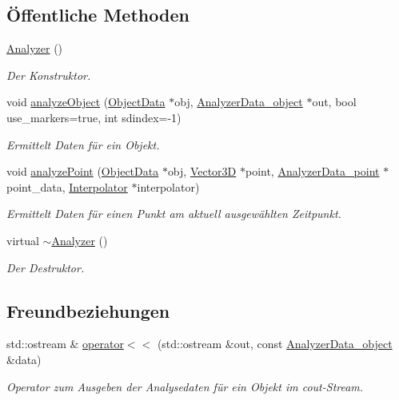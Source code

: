 \subsection*{Öffentliche Methoden}
\begin{DoxyCompactItemize}
\item 
\hyperlink{classAnalyzer_a1be2ff17bba265bdef6e1b44748eaf96}{Analyzer} ()
\begin{DoxyCompactList}\small\item\em Der Konstruktor. \end{DoxyCompactList}\item 
void \hyperlink{classAnalyzer_a2a7b5f169f664ccd9f206e508cba78ef}{analyze\-Object} (\hyperlink{classObjectData}{Object\-Data} $\ast$obj, \hyperlink{structAnalyzer_1_1AnalyzerData__object}{Analyzer\-Data\-\_\-object} $\ast$out, bool use\-\_\-markers=true, int sdindex=-\/1)
\begin{DoxyCompactList}\small\item\em Ermittelt Daten für ein Objekt. \end{DoxyCompactList}\item 
void \hyperlink{classAnalyzer_a8f73ee0aa71ae395a74b43dc76b35458}{analyze\-Point} (\hyperlink{classObjectData}{Object\-Data} $\ast$obj, \hyperlink{classVector3D}{Vector3\-D} $\ast$point, \hyperlink{structAnalyzer_1_1AnalyzerData__point}{Analyzer\-Data\-\_\-point} $\ast$point\-\_\-data, \hyperlink{classInterpolator}{Interpolator} $\ast$interpolator)
\begin{DoxyCompactList}\small\item\em Ermittelt Daten für einen Punkt am aktuell ausgewählten Zeitpunkt. \end{DoxyCompactList}\item 
virtual \hyperlink{classAnalyzer_afa899ac3a6aabbe59f791f69368ad740}{$\sim$\-Analyzer} ()
\begin{DoxyCompactList}\small\item\em Der Destruktor. \end{DoxyCompactList}\end{DoxyCompactItemize}
\subsection*{Freundbeziehungen}
\begin{DoxyCompactItemize}
\item 
std\-::ostream \& \hyperlink{classAnalyzer_a031acd0d5f2a8c997c18645dd548dca7}{operator$<$$<$} (std\-::ostream \&out, const \hyperlink{structAnalyzer_1_1AnalyzerData__object}{Analyzer\-Data\-\_\-object} \&data)
\begin{DoxyCompactList}\small\item\em Operator zum Ausgeben der Analysedaten für ein Objekt im cout-\/\-Stream. \end{DoxyCompactList}\end{DoxyCompactItemize}


